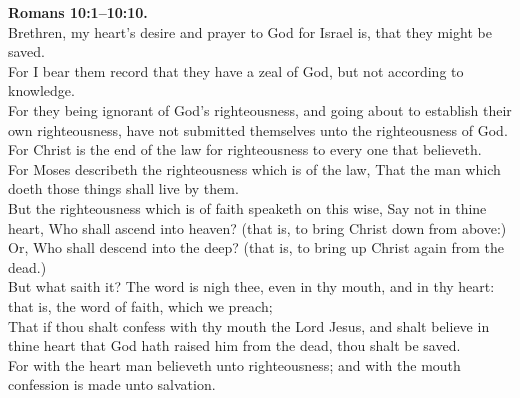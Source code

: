\documentclass[10pt]{article} %
\begin{document}
{\begin{minipage}[t]{0.45\textwidth}
\textbf{Romans 10:1--10:10.}\\
Brethren, my heart's desire and prayer to God for Israel is, that they might be saved.\\
For I bear them record that they have a zeal of God, but not according to knowledge.\\
For they being ignorant of God's righteousness, and going about to establish their own righteousness, have not submitted themselves unto the righteousness of God.\\
For Christ is the end of the law for righteousness to every one that believeth.\\
For Moses describeth the righteousness which is of the law, That the man which doeth those things shall live by them.\\
But the righteousness which is of faith speaketh on this wise, Say not in thine heart, Who shall ascend into heaven? (that is, to bring Christ down from above:)\\
Or, Who shall descend into the deep? (that is, to bring up Christ again from the dead.)\\
But what saith it? The word is nigh thee, even in thy mouth, and in thy heart: that is, the word of faith, which we preach;\\
That if thou shalt confess with thy mouth the Lord Jesus, and shalt believe in thine heart that God hath raised him from the dead, thou shalt be saved.\\
For with the heart man believeth unto righteousness; and with the mouth confession is made unto salvation.\\

\end{minipage}}
\vspace*{\fill}
\newpage
\Huge%
\vspace*{\fill}
\end{document}
